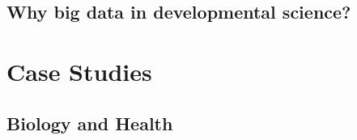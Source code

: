 \documentclass[letterpaper,man,apacite]{apa6}
\begin{document}
\subsection{Why big data in developmental science?}

\section{Case Studies}

\subsection{Biology and Health}

\end{document}
